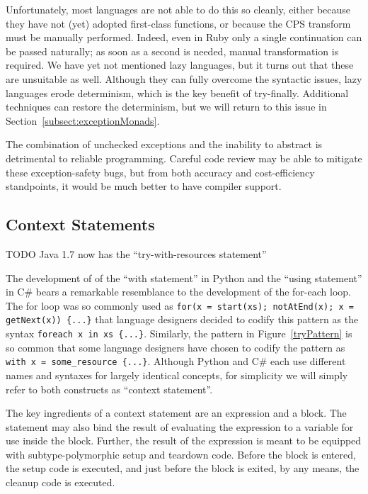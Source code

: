 \documentclass[11pt]{article}
\begin{document}
Unfortunately, most languages are not able to do this so cleanly, either because they have not (yet) adopted first-class functions, or because the CPS transform must be manually performed.
Indeed, even in Ruby only a single continuation can be passed naturally; as soon as a second is needed, manual transformation is required.
We have yet not mentioned lazy languages, but it turns out that these are unsuitable as well.
Although they can fully overcome the syntactic issues, lazy languages erode determinism, which is the key benefit of try-finally.
Additional techniques can restore the determinism, but we will return to this issue in Section~\ref{subsect:exceptionMonads}.

The combination of unchecked exceptions and the inability to abstract is detrimental to reliable programming.
Careful code review may be able to mitigate these exception-safety bugs, but from both accuracy and cost-efficiency standpoints, it would be much better to have compiler support.


\subsection{Context Statements}
\label{context-statements}

TODO Java 1.7 now has the ``try-with-resources statement''

The development of of the ``with statement'' in Python and the ``using statement'' in C\# bears a remarkable resemblance to the development of the for-each loop.
The for loop was so commonly used as \verb|for(x = start(xs); notAtEnd(x); x = getNext(x)) {...}| that language designers decided to codify this pattern as the syntax \verb|foreach x in xs {...}|.
Similarly, the pattern in Figure~\ref{tryPattern} is so common that some language designers have chosen to codify the pattern as \verb|with x = some_resource {...}|.
Although Python and C\# each use different names and syntaxes for largely identical concepts, for simplicity we will simply refer to both constructs as ``context statement''.

The key ingredients of a context statement are an expression and a block.
The statement may also bind the result of evaluating the expression to a variable for use inside the block.
Further, the result of the expression is meant to be equipped with subtype-polymorphic setup and teardown code.
Before the block is entered, the setup code is executed, and just before the block is exited, by any means, the cleanup code is executed.\cite{PEP343}\cite{cSharpStandard}
\end{document}
